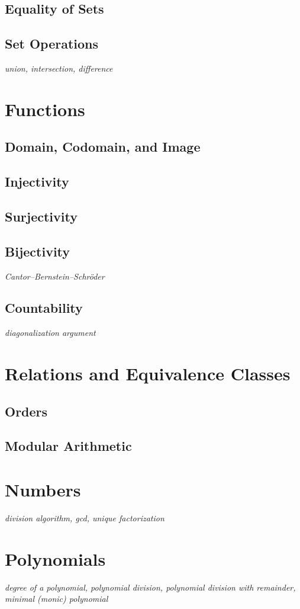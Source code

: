 \documentclass[../../../main.tex]{subfiles}
\begin{document}
\subsection{Equality of Sets}
\subsection{Set Operations}
\textit{union, intersection, difference}

\section{Functions}
\subsection{Domain, Codomain, and Image}
\subsection{Injectivity}
\subsection{Surjectivity}
\subsection{Bijectivity}
\textit{Cantor–Bernstein–Schröder}
\subsection{Countability}
\textit{diagonalization argument}

\section{Relations and Equivalence Classes}
\subsection{Orders}
\subsection{Modular Arithmetic}

\section{Numbers}
\textit{division algorithm, gcd, unique factorization}

\section{Polynomials}
\textit{degree of a polynomial, polynomial division, polynomial division with remainder, minimal (monic) polynomial}

\printbibliography[
    heading=subbibintoc,
    title={References}
]
\end{document}
